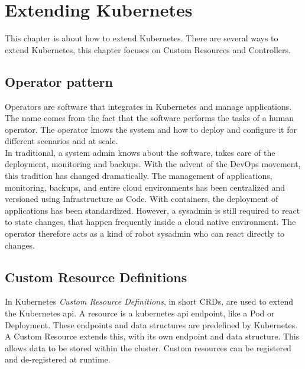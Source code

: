 \chapter{Extending Kubernetes}

This chapter is about how to extend Kubernetes.
There are several ways to extend Kubernetes, this chapter focuses on Custom Resources and Controllers.

\section{Operator pattern}\label{sec:operator-pattern}

Operators are software that integrates in Kubernetes and manage applications.
The name comes from the fact that the software performs the tasks of a human operator.
The operator knows the system and how to deploy and configure it for different scenarios and at scale.~\cite{KUBERNETES-OPERATOR}
\\
In traditional, a system admin knows about the software, takes care of the deployment, monitoring and backups.
With the advent of the DevOps movement, this tradition has changed dramatically.
The management of applications, monitoring, backups, and entire cloud environments has been centralized and versioned using Infrastructure as Code.
With containers, the deployment of applications has been standardized.
However, a sysadmin is still required to react to state changes, that happen frequently inside a cloud native environment.
The operator therefore acts as a kind of robot sysadmin who can react directly to changes.~\cite{RED-HAT-OPERATOR}

\section{Custom Resource Definitions}\label{sec:custom-resource-definitions}

In Kubernetes \textit{Custom Resource Definitions}, in short CRDs, are used to extend the Kubernetes api.
A resource is a kubernetes api endpoint, like a Pod or Deployment.
These endpoints and data structures are predefined by Kubernetes.
A Custom Resource extends this, with its own endpoint and data structure.
This allows data to be stored within the cluster.
Custom resources can be registered and de-registered at runtime.~\cite{KUBERNETES-CRD}

